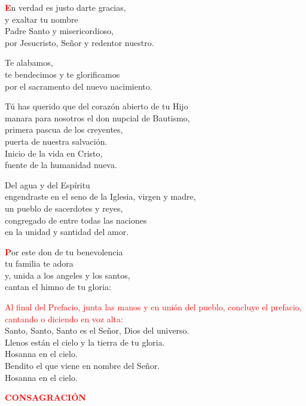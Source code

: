 \documentclass[12pt, letterpaper, spanish]{article}
\begin{document}
  \lettrine[lines=2]{\bfseries \textcolor{red}{E}}{}\Large n verdad es justo darte gracias, \\ 
  y exaltar tu nombre \\ 
  Padre Santo y misericordioso, \\
  por Jesucristo, Se\~nor y redentor nuestro.

  \noindent
  Te alabamos, \\
  te bendecimos y te glorificamos \\
  por el sacramento del nuevo nacimiento.

  \noindent
  T\'u has querido que del coraz\'on abierto de tu Hijo \\
  manara para nosotros el don nupcial de Bautismo, \\
  primera pascua de los creyentes, \\
  puerta de nuestra salvaci\'on. \\
  Inicio de la vida en Cristo, \\
  fuente de la humanidad nueva.

  \noindent
  Del agua y del Esp\'iritu \\
  engendraste en el seno de la Iglesia, virgen y madre, \\
  un pueblo de sacerdotes y reyes, \\
  congregado de entre todas las naciones \\
  en la unidad y santidad del amor.

  \lettrine[lines=2]{\bfseries \textcolor{red}{P}}{}\Large or este don de tu benevolencia \\
  tu familia te adora \\
  y, unida a los angeles y los santos, \\
  cantan el himno de tu gloria:

  \large{\textcolor{red}{Al final del Prefacio, junta las manos y en uni\'on del pueblo, concluye el prefacio, cantando o diciendo en voz alta:}}\\
  \Large {Santo, Santo, Santo es el Se\~nor, Dios del universo.\\
  Llenos est\'an el cielo y la tierra de tu gloria.\\
  Hosanna en el cielo.\\
  Bendito el que viene en nombre del Se\~nor.\\
  Hosanna en el cielo.}

  \clearpage

  \Large {\bfseries \textcolor{red}{CONSAGRACI\'ON}} 
\end{document}
